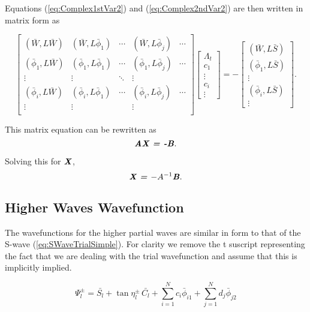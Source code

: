 \documentclass[preprint,showpacs,preprintnumbers,amsmath,amssymb]{revtex4}
\newcommand{\beq}{\begin{equation}}
\newcommand{\eeq}{\end{equation}}
\begin{document}
Equations (\ref{eq:Complex1stVar2}) and (\ref{eq:Complex2ndVar2}) are then written in matrix form as

\begin{equation}
\label{eq:ComplexKohnMatrix}
\begin{bmatrix} 
 (\bar{W},L\bar{W}) & (\bar{W},L\bar{\phi}_1) & \cdots & (\bar{W},L\bar{\phi}_j) & \cdots\\
 (\bar{\phi}_1,L\bar{W}) & (\bar{\phi}_1,L\bar{\phi}_1) & \cdots & (\bar{\phi}_1,L\bar{\phi}_j) & \cdots\\
 \vdots & \vdots & \ddots & \vdots \\
 (\bar{\phi}_i,L\bar{W}) & (\bar{\phi}_i,L\bar{\phi}_1) & \cdots & (\bar{\phi}_i,L\bar{\phi}_j) & \cdots\\
 \vdots & \vdots & & \vdots & \\
\end{bmatrix}
\begin{bmatrix}
\Lambda_t\\
c_1\\
\vdots\\
c_i\\
\vdots
\end{bmatrix}
= -
\begin{bmatrix}
(\bar{W},L\bar{S}) \\
(\bar{\phi}_1,L\bar{S}) \\
\vdots \\
(\bar{\phi}_i,L\bar{S}) \\
\vdots
\end{bmatrix}.
\end{equation}

\noindent This matrix equation can be rewritten as
\beq
\textbf{\emph{AX = -B}}.
\eeq

\noindent Solving this for $\textbf{\emph{X}}$,
\beq
\textbf{\emph{X = $-A^{-1}$B}}.
\eeq


\subsection{Higher Waves Wavefunction}
The  wavefunctions for the higher partial waves are similar in form to that of the S-wave (\ref{eq:SWaveTrialSimple}). For clarity we remove the t suscript representing the fact that we are dealing with the trial wavefunction and assume that this is implicitly implied.

\begin{equation}
\Psi_l^\pm = \bar{S_l} + \tan \eta_l^\pm \, \bar{C_l} + \sum_{i=1}^N c_i \bar{\phi}_{i1} + \sum_{j=1}^N d_j \bar{\phi}_{j2}
\label{eq:PWaveSimple}
\end{equation}
\end{document}
